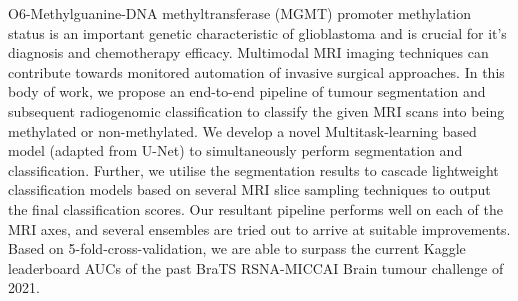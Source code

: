 


\begin{abstracts}        %

O6-Methylguanine-DNA methyltransferase (MGMT) promoter methylation status is an important genetic characteristic of glioblastoma and is crucial for it's diagnosis and chemotherapy efficacy. Multimodal MRI imaging techniques can contribute towards monitored automation of invasive surgical approaches. In this body of work, we propose an end-to-end pipeline of tumour segmentation and subsequent radiogenomic classification to classify the given MRI scans into being methylated or non-methylated. We develop a novel Multitask-learning based model (adapted from U-Net) to simultaneously perform segmentation and classification. Further, we utilise the segmentation results to cascade lightweight classification models based on several MRI slice sampling techniques to output the final classification scores. Our resultant pipeline performs well on each of the MRI axes, and several ensembles are tried out to arrive at suitable improvements. Based on 5-fold-cross-validation, we are able to surpass the current Kaggle leaderboard AUCs of the past BraTS RSNA-MICCAI Brain tumour challenge of 2021.


\end{abstracts}




